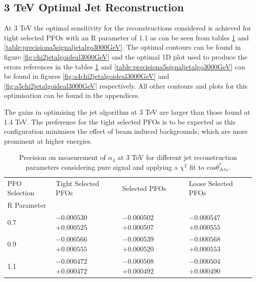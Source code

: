 \subsection{3 TeV Optimal Jet Reconstruction}
At 3 TeV the optimal sensitivity for the reconstructions considered is achieved for tight selected PFOs with an R parameter of 1.1 as can be seen from tables \ref{table:precisiona4signaljetalgo3000GeV} and \ref{table:precisiona5signaljetalgo3000GeV}.  The optimal contours can be found in figure \ref{fig:chi2jetalgoideal3000GeV} and the optimal 1D plot used to produce the errors references in the tables \ref{table:precisiona4signaljetalgo3000GeV} and \ref{table:precisiona5signaljetalgo3000GeV} can be found in figures \ref{fig:a4chi2jetalgoideal3000GeV} and \ref{fig:a5chi2jetalgoideal3000GeV} respectively.  All other contours and plots for this optimisation can be found in the appendices.  

The gains in optimising the jet algorithm at 3 TeV are larger than those found at 1.4 TeV.  The preference for the tight selected PFOs is to be expected as this configuration minimises the effect of beam induced backgrounds, which are more prominent at higher energies.  

\begin{table}[h!]
\centering
\begin{tabular}{ l l l l }
\hline
PFO Selection & Tight Selected PFOs & Selected PFOs & Loose Selected PFOs \\ 
R Parameter & & & \\ 
\hline
0.7 & $-0.000530$ $+0.000525$ & $-0.000502$ $+0.000507$ & $-0.000547$ $+0.000555$ \\
0.9 & $-0.000566$ $+0.000555$ & $-0.000539$ $+0.000520$ & $-0.000568$ $+0.000553$ \\
1.1 & $-0.000472$ $+0.000472$ & $-0.000508$ $+0.000492$ & $-0.000504$ $+0.000490$ \\
\hline
\end{tabular}
\caption[$1\sigma$ precision on measurement of $\alpha_{4}$ for different jet reconstruction parameters considering pure signal at 3 TeV.]{Precision on measurement of $\alpha_{4}$ at 3 TeV for different jet reconstruction parameters considering pure signal and applying a $\chi^{2}$ fit to $\text{cos}\theta^{*}_{Jets}$.}
\label{table:precisiona4signaljetalgo3000GeV}
\end{table}

